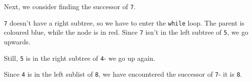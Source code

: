 \documentclass[a4paper, openany]{memoir}
\begin{document}
\noindent Next, we consider finding the successor of \texttt{7}.
\begin{center}
\end{center}
\texttt{7} doesn't have a right subtree, so we have to enter the \texttt{while} loop. The parent is coloured blue, while the node is in red. Since \texttt{7} isn't in the left subtree of \texttt{5}, we go upwards.
\begin{center}
\end{center}
Still, \texttt{5} is in the right subtree of \texttt{4}- we go up again.
\begin{center}
\end{center}
Since \texttt{4} is in the left sublist of \texttt{8}, we have encountered the successor of \texttt{7}- it is \texttt{8}.
\end{document}

